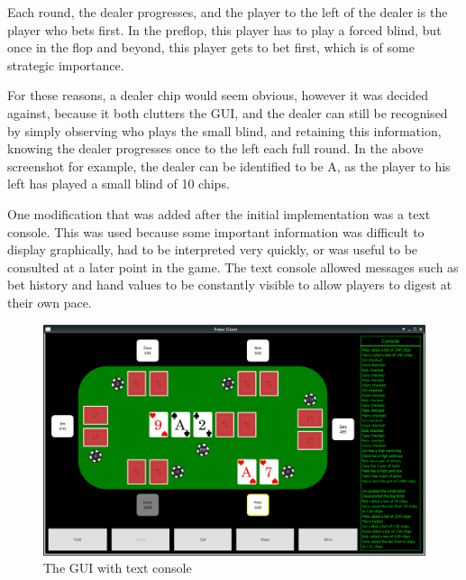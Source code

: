 Each round, the dealer progresses, and the player to
the left of the dealer is the player who bets first. In the preflop, this
player has to play a forced blind, but once in the flop and beyond, this player
gets to bet first, which is of some strategic importance. 

For these reasons, a dealer chip would seem obvious, however it was decided
against, because it both clutters the GUI, and the dealer can still be
recognised by simply observing who plays the small blind, and retaining this
information, knowing the dealer progresses once to the left each full round.
In the above screenshot for example, the dealer can be identified to be A,
as the player to his left has played a small blind of 10 chips.

One modification that was added after the initial implementation was a text
console. This was used because some important information was difficult to 
display graphically, had to be interpreted very quickly, or was useful to be 
consulted at a later point in the game. The text console allowed messages such 
as bet history and hand values to be constantly visible to allow players to 
digest at their own pace.

\begin{figure}[h]
    \centering
    \includegraphics[width=\textwidth]{../images/guiwithconsole.png}
    \caption{The GUI with text console}%
    \label{fig:guiwithconsole}
\end{figure}
